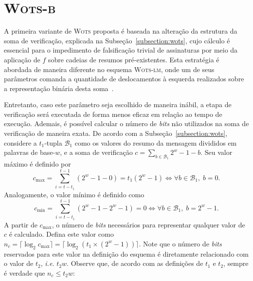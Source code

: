 \documentclass{ufsctex/ufsctex}
\newcommand{\bone}{\mathcal{B}_{1}}
\newcommand{\wots}{\textsc{Wots}}
\newcommand{\wotslm}{\textsc{Wots-lm}}
\newcommand{\wotsb}{\textsc{Wots-b}}
\begin{document}
\section{\wotsb{}}\label{section:wotsb}

A primeira variante de \wots{} proposta é baseada na alteração da estrutura da
soma de verificação, explicada na Subseção~\ref{subsection:wots}, cujo cálculo
é essencial para o impedimento de falsificação trivial de assinaturas por meio
da aplicação de $f$ sobre cadeias de resumos pré-existentes. Esta estratégia é
abordada de maneira diferente no esquema \wotslm{}, onde um de seus parâmetros
comanda a quantidade de deslocamentos à esquerda realizados sobre a
representação binária desta soma~\cite[Seção 4.4]{McGrew:report:2018:apr}.

Entretanto, caso este parâmetro seja escolhido de maneira inábil, a etapa de
verificação será executada de forma menos eficaz em relação ao tempo de
execução. Ademais, é possível calcular o número de \emph{bits} não utilizados
na soma de verificação de maneira exata. De acordo com a
Subseção~\ref{subsection:wots}, considere a $t_{1}$-tupla $\bone{}$ como os
valores do resumo da mensagem divididos em palavras de base-$w$, e a soma de
verificação $c = \sum_{b \in \bone{}} 2^{w} - 1 - b$. Seu valor máximo é
definido por
\begin{equation}
  c_{\max} = \sum_{i = t - t_{1}}^{t - 1} (2^{w} - 1 - 0) = t_{1}(2^{w} - 1)
    \iff \forall b \in \bone{}, \; b = 0.
\end{equation}
Analogamente, o valor mínimo é definido como
\begin{equation}
  c_{\min} = \sum_{i = t - t_{1}}^{t - 1} (2^{w} - 1 - 2^{w} - 1) = 0
    \iff \forall b \in \bone{}, \; b = 2^{w} - 1.
\end{equation}
A partir de $c_{\max}$, o número de \emph{bits} necessários para representar
qualquer valor de $c$ é calculado. Defina este valor como $n_{c} = \lceil
\log_2 c_{\max} \rceil = \lceil \log_2 (t_{1} \times (2^{w} - 1)) \rceil$. Note
que o número de \emph{bits} reservados para este valor na definição do esquema
é diretamente relacionado com o valor de $t_{2}$, \emph{i.e.} $t_{2}w$. Observe
que, de acordo com as definições de $t_{1}$ e $t_{2}$, sempre é verdade que
$n_{c} \leq t_{2}w$:
\end{document}
